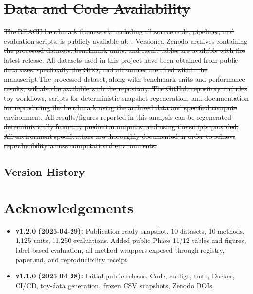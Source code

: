 \documentclass[10pt]{article}
\providecommand{\DIFaddtex}[1]{{\protect\color{trackgreen}#1}} %
\providecommand{\DIFdeltex}[1]{{\protect\color{red}\sout{#1}}}                      %
\providecommand{\DIFaddbegin}{} %
\providecommand{\DIFaddend}{} %
\providecommand{\DIFdelbegin}{} %
\providecommand{\DIFdelend}{} %
\providecommand{\DIFadd}[1]{\texorpdfstring{\DIFaddtex{#1}}{#1}} %
\providecommand{\DIFdel}[1]{\texorpdfstring{\DIFdeltex{#1}}{}} %
\newcommand{\DIFscaledelfig}{0.5}
\newlength{\DIFdelgraphicswidth} %
\newlength{\DIFdelgraphicsheight} %
\newcommand{\DIFaddincludegraphics}[2][]{{\color{trackgreen}\fbox{\DIFOincludegraphics[#1]{#2}}}} %
\newcommand{\DIFdelincludegraphics}[2][]{%
\sbox{\DIFdelgraphicsbox}{\DIFOincludegraphics[#1]{#2}}%
\settoboxwidth{\DIFdelgraphicswidth}{\DIFdelgraphicsbox} %
\settoboxtotalheight{\DIFdelgraphicsheight}{\DIFdelgraphicsbox} %
\scalebox{\DIFscaledelfig}{%
\parbox[b]{\DIFdelgraphicswidth}{\usebox{\DIFdelgraphicsbox}\\[-\baselineskip] \rule{\DIFdelgraphicswidth}{0em}}\llap{\resizebox{\DIFdelgraphicswidth}{\DIFdelgraphicsheight}{%
\setlength{\unitlength}{\DIFdelgraphicswidth}%
\begin{picture}(1,1)%
\thicklines\linethickness{2pt} %
{\color[rgb]{1,0,0}\put(0,0){\framebox(1,1){}}}%
{\color[rgb]{1,0,0}\put(0,0){\line( 1,1){1}}}%
{\color[rgb]{1,0,0}\put(0,1){\line(1,-1){1}}}%
\end{picture}%
}\hspace*{3pt}}} %
} %
\DeclareRobustCommand{\DIFaddbegin}{\DIFOaddbegin \let\includegraphics\DIFaddincludegraphics} %
\DeclareRobustCommand{\DIFaddend}{\DIFOaddend \let\includegraphics\DIFOincludegraphics} %
\DeclareRobustCommand{\DIFdelbegin}{\DIFOdelbegin \let\includegraphics\DIFdelincludegraphics} %
\DeclareRobustCommand{\DIFdelend}{\DIFOaddend \let\includegraphics\DIFOincludegraphics} %
\providecommand{\tightlist}{\setlength{\itemsep}{0pt}\setlength{\parskip}{0pt}}
\begin{document}
\DIFdelbegin \section*{\DIFdel{Data and Code Availability}}
\DIFdelend \DIFaddbegin \begin{center}\DIFadd{\rule{0.5\linewidth}{0.5pt}}\end{center}
\DIFaddend 

\DIFdelbegin \DIFdel{The REACH benchmark framework, including all source code, pipelines, and evaluation scripts, is publicly available at: }%
\DIFdel{. Versioned Zenodo archives containing the processed datasets,
  benchmark units, and result tables are available with the latest release. All datasets used in this project have been obtained from public databases, specifically the GEO, and all sources are cited within the manuscript.The processed dataset, along with benchmark units and performance results, will also be available with the repository.
The GitHub repository includes toy workflows, scripts for deterministic snapshot regeneration,
  and documentation for reproducing the benchmark using the archived data and specified compute environment. All results/figures reported in this analysis can be regenerated deterministically from any prediction output stored using the scripts provided. All environment specifications are thoroughly documented in order to achieve reproducibility across computational environments.
}\DIFdelend \DIFaddbegin \subsection{\DIFadd{Version History}}\label{version-history}
\DIFaddend 

\DIFdelbegin \section*{\DIFdel{Acknowledgements}}
\DIFdelend \DIFaddbegin \begin{itemize}
\tightlist
\item
  \textbf{\DIFadd{v1.2.0 (2026-04-29):}} \DIFadd{Publication-ready snapshot. 10 datasets,
  10 methods, 1,125 units, 11,250 evaluations. Added public Phase 11/12
  tables and figures, label-based evaluation, all method wrappers
  exposed through registry, paper.md, and reproducibility receipt.
}\item
  \textbf{\DIFadd{v1.1.0 (2026-04-28):}} \DIFadd{Initial public release. Code, configs,
  tests, Docker, CI/CD, toy-data generation, frozen CSV snapshots,
  Zenodo DOIs.
}\end{itemize}
\DIFaddend 

\nocite{*}


\end{document}
